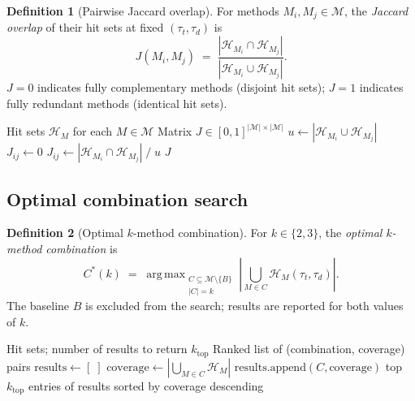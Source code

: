 \documentclass[11pt, a4paper]{article}
\theoremstyle{definition}
\newtheorem{definition}{Definition}[section]
\DeclareMathOperator*{\argmax}{arg\,max}
\newcommand{\1}[1]{\mathbf{1}\!\left[#1\right]}   %
\newcommand{\Hit}{\mathcal{H}}                      %
\newcommand{\Methods}{\mathcal{M}}                  %
\begin{document}
\begin{definition}[Pairwise Jaccard overlap]
\label{def:jaccard}
For methods $M_i, M_j \in \mathcal{M}$, the \emph{Jaccard overlap} of
their hit sets at fixed $(\tau_t, \tau_d)$ is
\[
  J(M_i, M_j)
  \;=\; \frac{|\Hit_{M_i} \cap \Hit_{M_j}|}{|\Hit_{M_i} \cup \Hit_{M_j}|}.
\]
$J = 0$ indicates fully complementary methods (disjoint hit sets);
$J = 1$ indicates fully redundant methods (identical hit sets).
\end{definition}

\begin{algorithm}[H]
\caption{\textsc{Complementarity}$\!\bigl((\Hit_M)_{M \in \mathcal{M}}\bigr)$
         --- pairwise Jaccard matrix}
\label{alg:complementarity}
\begin{algorithmic}[1]
\Require Hit sets $\Hit_M$ for each $M \in \Methods$
\Ensure  Matrix $J \in [0,1]^{|\Methods| \times |\Methods|}$
\For{$M_i \in \Methods$}
  \For{$M_j \in \Methods$}
    \State $u \leftarrow |\Hit_{M_i} \cup \Hit_{M_j}|$
      \State $J_{ij} \leftarrow 0$
    \Else
      \State $J_{ij} \leftarrow |\Hit_{M_i} \cap \Hit_{M_j}| \;/\; u$
    \EndIf
  \EndFor
\EndFor
\Return $J$
\end{algorithmic}
\end{algorithm}

\subsection{Optimal combination search}

\begin{definition}[Optimal $k$-method combination]
\label{def:best-combo}
For $k \in \{2, 3\}$, the \emph{optimal $k$-method combination} is
\[
  C^*(k)
  \;=\; \argmax_{\substack{C \subseteq \Methods \setminus \{B\} \\ |C| = k}}
        \left|\bigcup_{M \in C} \Hit_M(\tau_t, \tau_d)\right|.
\]
The baseline $B$ is excluded from the search; results are reported
for both values of $k$.
\end{definition}

\begin{algorithm}[H]
\caption{\textsc{BestCombinations}$\!\bigl((\Hit_M)_{M \in \mathcal{M}},\, k_\text{top}\bigr)$}
\label{alg:best-combos}
\begin{algorithmic}[1]
\Require Hit sets; number of results to return $k_\text{top}$
\Ensure  Ranked list of (combination, coverage) pairs
\State $\text{results} \leftarrow [\;]$
  \For{each $C \subseteq \Methods \setminus \{B\}$ with $|C| = k$}
    \State $\text{coverage} \leftarrow \left|\bigcup_{M \in C} \Hit_M\right|$
    \State $\text{results.append}(C, \text{coverage})$
  \EndFor
\EndFor
\Return top $k_\text{top}$ entries of results sorted by coverage descending
\end{algorithmic}
\end{algorithm}
\end{document}
